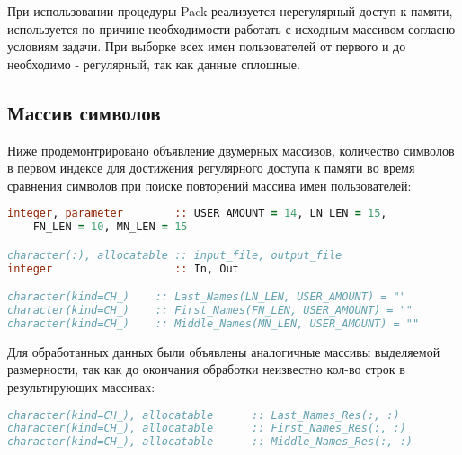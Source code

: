 \documentclass[a4paper,12pt]{article}
\begin{document}
При использовании процедуры Pack реализуется нерегулярный доступ к памяти, используется по причине необходимости работать с исходным массивом согласно условиям задачи. При выборке всех имен пользователей от первого и до необходимо - регулярный, так как данные сплошные.

\subsection{Массив символов}
Ниже продемонтрировано объявление двумерных массивов, количество символов в первом индексе для достижения регулярного доступа к памяти во время сравнения символов при поиске повторений массива имен пользователей:
\begin{lstlisting}[language=Fortran]
integer, parameter        :: USER_AMOUNT = 14, LN_LEN = 15, 
	FN_LEN = 10, MN_LEN = 15

character(:), allocatable :: input_file, output_file
integer                   :: In, Out

character(kind=CH_)    :: Last_Names(LN_LEN, USER_AMOUNT) = ""
character(kind=CH_)    :: First_Names(FN_LEN, USER_AMOUNT) = ""
character(kind=CH_)    :: Middle_Names(MN_LEN, USER_AMOUNT) = ""
\end{lstlisting}

Для обработанных данных были объявлены аналогичные массивы выделяемой размерности, так как до окончания обработки неизвестно кол-во строк в результирующих массивах:
\begin{lstlisting}[language=Fortran]
character(kind=CH_), allocatable      :: Last_Names_Res(:, :)
character(kind=CH_), allocatable      :: First_Names_Res(:, :)
character(kind=CH_), allocatable      :: Middle_Names_Res(:, :)
\end{lstlisting}
\end{document}
